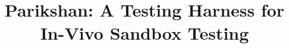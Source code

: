 \documentclass[letterpaper,twocolumn,10pt]{article}
\begin{document}
\date{}

\title{\Large \bf Parikshan: A Testing Harness for In-Vivo Sandbox Testing}


\author{
}

\maketitle

\thispagestyle{empty}










\begin{spacing}{0.8}


\end{spacing}
\end{document}
